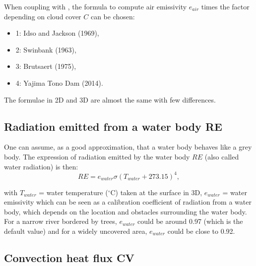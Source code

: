When coupling \waqtel with , the formula to compute air emissivity
$e_{air}$ times the factor depending on cloud cover $C$ can be chosen:
\begin{itemize}
\item 1: Idso and Jackson (1969),
\item 2: Swinbank (1963),
\item 3: Brutsaert (1975),
\item 4: Yajima Tono Dam (2014).
\end{itemize}

The formulae in 2D and 3D are almost the same with few differences.


\subsection{Radiation emitted from a water body RE}

One can assume, as a good approximation, that a water body behaves like a grey body.
The expression of radiation emitted by the water body $RE$
(also called water radiation) is then:\\

\begin{equation}
  RE = e_{water} \sigma (T_{water} + 273.15)^4,
\end{equation}

with $T_{water}$ = water temperature ($^{\circ}$C)
taken at the surface in 3D,
$e_{water}$ = water emissivity which can be seen as a
calibration coefficient of radiation from a water body,
which depends on the location and obstacles surrounding the water body.
For a narrow river bordered by trees, $e_{water}$ could be around 0.97
(which is the default value)
and for a widely uncovered area, $e_{water}$ could be close to 0.92.

\subsection{Convection heat flux CV}

